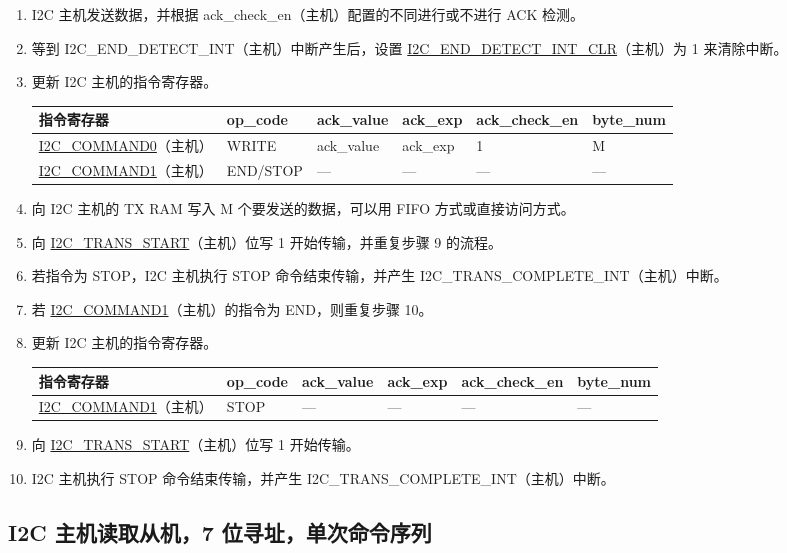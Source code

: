 \documentclass[main\_\_CN.tex]{subfiles}
\begin{document}
\begin{enumerate}
\item I2C 主机发送数据，并根据 ack\_check\_en（主机）配置的不同进行或不进行 ACK 检测。

\item 等到 I2C\_END\_DETECT\_INT（主机）中断产生后，设置 \hyperref[fielddesc:I2CENDDETECTINTCLR]{I2C\_END\_DETECT\_INT\_CLR}（主机）为 1 来清除中断。
\item 更新 I2C 主机的指令寄存器。
\begin{longtable}{ | p{4cm} | p{2cm} | p{2cm} | p{2cm} |p{2cm} | p{2cm} |}
\hline\rowcolor{lightgray}
指令寄存器& op\_code & ack\_value&ack\_exp&ack\_check\_en&byte\_num  \\ \hline
\hyperref[fielddesc:I2CCOMMAND0]{I2C\_COMMAND0}（主机）& WRITE& ack\_value&ack\_exp&1&M  \\ \hline
\hyperref[fielddesc:I2CCOMMAND1]{I2C\_COMMAND1}（主机）& END/STOP& ---&---&---&---  \\ \hline
\end{longtable}
\item 向 I2C 主机的 TX RAM 写入 M 个要发送的数据，可以用 FIFO 方式或直接访问方式。
\item 向 \hyperref[fielddesc:I2CTRANSSTART]{I2C\_TRANS\_START}（主机）位写 1 开始传输，并重复步骤 9 的流程。
\item 若指令为 STOP，I2C 主机执行 STOP 命令结束传输，并产生 I2C\_TRANS\_COMPLETE\_INT（主机）中断。
\item 若 \hyperref[fielddesc:I2CCOMMAND1]{I2C\_COMMAND1}（主机）的指令为 END，则重复步骤 10。
\item 更新 I2C 主机的指令寄存器。
\begin{longtable}{ | p{4cm} | p{2cm} | p{2cm} | p{2cm} |p{2cm} | p{2cm} |}
\hline\rowcolor{lightgray}
指令寄存器& op\_code & ack\_value&ack\_exp&ack\_check\_en&byte\_num  \\ \hline
\hyperref[fielddesc:I2CCOMMAND1]{I2C\_COMMAND1}（主机）& STOP& ---&---&---&---  \\ \hline
\end{longtable}
\item 向 \hyperref[fielddesc:I2CTRANSSTART]{I2C\_TRANS\_START}（主机）位写 1 开始传输。
\item I2C 主机执行 STOP 命令结束传输，并产生 I2C\_TRANS\_COMPLETE\_INT（主机）中断。

\end{enumerate}



\subsection{I2C 主机读取从机，7 位寻址，单次命令序列}
\end{document}

